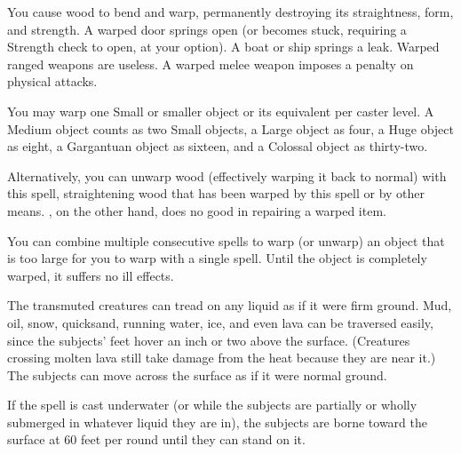 \begin{spelleffect}
    You cause wood to bend and warp, permanently destroying its straightness, form, and strength. A warped door springs open (or becomes stuck, requiring a Strength check to open, at your option). A boat or ship springs a leak. Warped ranged weapons are useless. A warped melee weapon imposes a  penalty on physical attacks.
    \par You may warp one Small or smaller object or its equivalent per caster level. A Medium object counts as two Small objects, a Large object as four, a Huge object as eight, a Gargantuan object as sixteen, and a Colossal object as thirty-two.
    \par Alternatively, you can unwarp wood (effectively warping it back to normal) with this spell, straightening wood that has been warped by this spell or by other means. , on the other hand, does no good in repairing a warped item.
\end{spelleffect}
\begin{spellnotes}
    You can combine multiple consecutive  spells to warp (or unwarp) an object that is too large for you to warp with a single spell. Until the object is completely warped, it suffers no ill effects.
\end{spellnotes}

\spelldur{\durlong \dismissable}
\begin{spelleffect}
    The transmuted creatures can tread on any liquid as if it were firm ground. Mud, oil, snow, quicksand, running water, ice, and even lava can be traversed easily, since the subjects' feet hover an inch or two above the surface. (Creatures crossing molten lava still take damage from the heat because they are near it.) The subjects can move across the surface as if it were normal ground.
    \par If the spell is cast underwater (or while the subjects are partially or wholly submerged in whatever liquid they are in), the subjects are borne toward the surface at 60 feet per round until they can stand on it.
\end{spelleffect}

